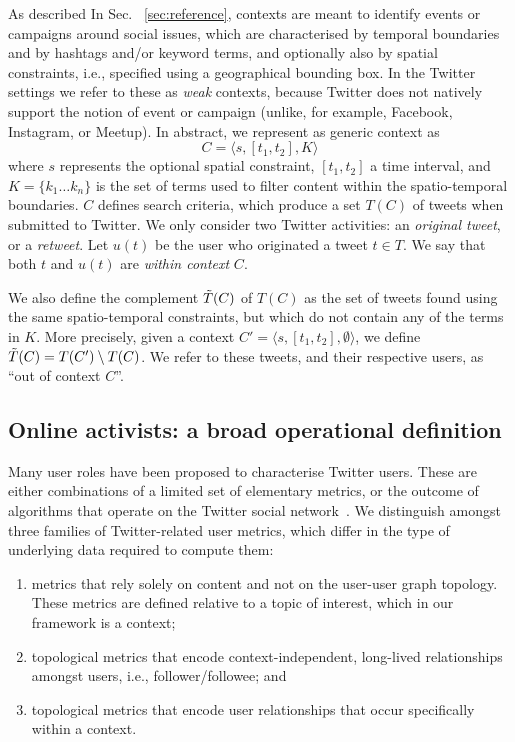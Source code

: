 \documentclass[runningheads]{llncs}
\begin{document}
As described In Sec. ~\ref{sec:reference}, contexts are meant to identify events or campaigns around social issues, which are characterised by temporal boundaries and by hashtags and/or keyword terms, and optionally also by spatial constraints, i.e., specified using a geographical bounding box.
In the Twitter settings we refer to these as \textit{weak} contexts, because Twitter does not natively support the notion of event or campaign (unlike, for example, Facebook, Instagram, or Meetup).
In abstract, we represent as generic context as
\begin{equation}
    C = \langle s, [t_1, t_2], K \rangle 
    \label{eq:context}
\end{equation}
where  $s$ represents the optional spatial constraint, $[t_1, t_2]$ a time interval, and $K = \{ k_1 \dots k_n\}$ is the set of terms used to filter content within the spatio-temporal boundaries.
%
$C$ defines search criteria, which produce a set $T(C)$ of tweets when submitted to Twitter.
We only consider two Twitter activities: an \textit{original tweet}, or a \textit{retweet}.
Let $u(t)$ be the user who originated a tweet $t \in T$.
We say that both $t$ and  $u(t)$ are \textit{within context} $C$.

We also define the complement $\Tilde{T}(C)$ of $T(C)$ as the set of tweets found using the same spatio-temporal constraints, but which do not contain any of the terms in $K$. More precisely, given a  context $C'= \langle s, [t_1, t_2], \emptyset \rangle$, we define $\Tilde{T}(C) = T(C') \setminus T(C)$. 
We refer to these tweets, and their respective users, as ``out of context $C$''.

\subsection{Online activists: a broad operational definition}

Many user roles have been proposed to characterise Twitter users. 
These are either combinations of a limited set of elementary metrics, or the outcome of algorithms that operate on the Twitter social network~\cite{RIQUELME2016949}. 
We distinguish amongst three families of Twitter-related user metrics, which differ in the type of underlying data required to compute them:
\begin{enumerate}
\item metrics  that rely solely on content and not on the user-user graph topology. These metrics are defined relative to a topic of interest, which in our framework is a context;
\item topological metrics that encode context-independent, long-lived relationships amongst users, i.e., follower/followee; and 
\item topological metrics that encode user relationships that occur specifically within a context.
\end{enumerate}
\end{document}
